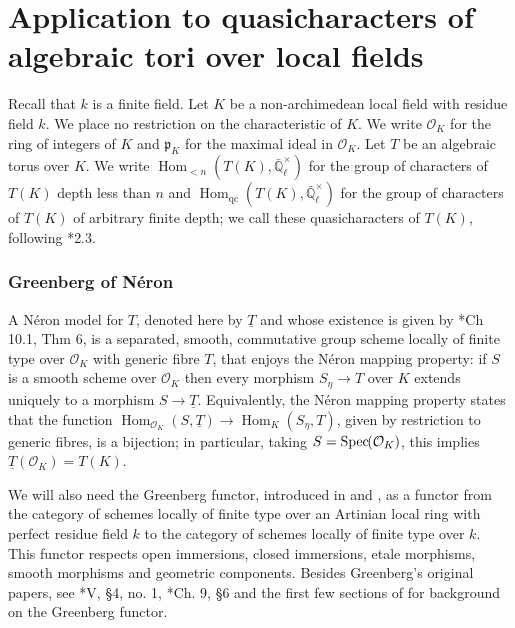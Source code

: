 \documentclass[11pt]{amsart}
\theoremstyle{plain}
\theoremstyle{definition}
\theoremstyle{remark}
\newcommand{\Spec}[1]{{\operatorname{Spec}\hskip-1pt( #1 )}}
\newcommand{\EE}{\mathbb{\bar Q}_\ell}
\newcommand{\OK}{\mathcal{O}_K}
\newcommand{\pK}{\mathfrak{p}_K}
\newcommand{\Fq}{k}
\newcommand{\EEx}{\EE^\times}
\DeclareMathOperator{\Hom}{Hom}
\newcommand{\TT}{\underline{T}}
\begin{document}
\part{Application to quasicharacters of algebraic tori over local fields}

Recall that $\Fq$ is a finite field.
Let $K$ be a non-archimedean local field with residue field $\Fq$.
We place no restriction on the characteristic of $K$. 
We write $\OK$ for the ring of integers of $K$ and $\pK$ for the maximal ideal in $\OK$. 
Let $T$ be an algebraic torus over $K$.
We write $\Hom_{< n}(T(K),\EEx)$ for the group of characters of $T(K)$ depth less than $n$ 
and $\Hom_{\text{qc}}(T(K),\EEx)$ for the group of characters of $T(K)$ of arbitrary finite depth;
we call these quasicharacters of $T(K)$, following \cite{tate:67a}*{2.3}.

\section{Greenberg of N\'eron}
\label{sec:GN}

A N\'eron model for $T$, denoted here by $\TT$ 
and whose existence is given by \cite{bosch-lutkebohmert-reynaud:NeronModels}*{Ch 10.1, Thm 6},
is a separated, smooth, commutative group scheme locally of finite type over $\OK$ with generic fibre $T$,
that enjoys the N\'eron mapping property:
if $S$ is a smooth scheme over $\OK$ then every morphism $S_\eta \to T$
over $K$ extends uniquely to a morphism $S \to \TT$. 
Equivalently, the
N\'eron mapping property states that the function
$\Hom_{\OK} (S,\TT) \to \Hom_K(S_\eta,T)$, given by restriction to
generic fibres, is a bijection; 
in particular, taking $S = \Spec{\OK}$, this implies $\TT(\OK) = T(K)$.

We will also need the Greenberg functor, 
introduced in \cite{greenberg:61} and \cite{greenberg:63a}, 
as a functor from the category of schemes locally of finite type 
over an Artinian local ring with perfect residue field $k$ 
to the category of schemes locally of finite type over $k$. 
This functor respects open immersions, closed immersions, 
etale morphisms, smooth morphisms and geometric components.
Besides Greenberg's original papers, see \cite{demazure-gabriel:GroupesAlgebriques}*{V, \S 4, no. 1}, \cite{bosch-lutkebohmert-reynaud:NeronModels}*{Ch. 9, \S 6} 
and the first few sections of \cite{stasinski:12a} 
for background on the Greenberg functor. 
\end{document}
